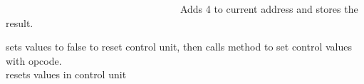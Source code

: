 ~\newline
~\newline
~\newline
~\newline
~\newline
~\newline
~\newline
~\newline
~\newline
~\newline
~\newline
~\newline
~\newline
~\newline
~\newline
~\newline
~\newline
~\newline
~\newline
~\newline
~\newline
 Adds 4 to current address and stores the result.

sets values to false to reset control unit, then calls method to set control values with opcode. ~\newline
~\newline
~\newline
~\newline
~\newline
~\newline
~\newline
~\newline
~\newline
~\newline
~\newline
~\newline
~\newline
~\newline
~\newline
~\newline
~\newline
~\newline
~\newline
~\newline
~\newline
~\newline
~\newline
~\newline
~\newline
~\newline
~\newline
~\newline
~\newline
~\newline
~\newline
~\newline
~\newline
~\newline
~\newline
~\newline
 resets values in control unit

